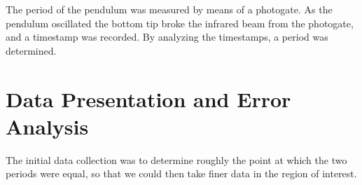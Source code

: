 The period of the pendulum was measured by means of a photogate. As the pendulum oscillated the bottom tip broke the infrared beam from the photogate, and a timestamp was recorded. By analyzing the timestamps, a period was determined.


%
%
%
%
%
%
%
\section{Data Presentation and Error Analysis}

The initial data collection was to determine roughly the point at which the two periods were equal, so that we could then take finer data in the region of interest.

